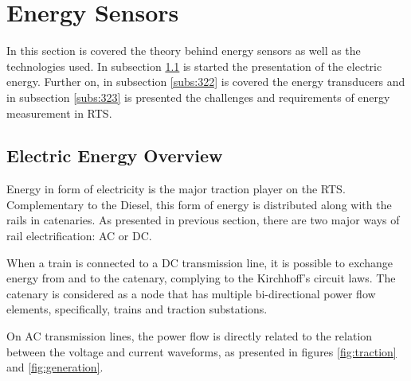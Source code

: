 


\section{Energy Sensors}


In this section is covered the theory behind energy sensors as well as the technologies used. In subsection \ref{subs:321} is started the presentation of the electric energy. Further on, in subsection \ref{subs:322} is covered the energy transducers and in subsection \ref{subs:323} is presented the challenges and requirements of energy measurement in \ac{RTS}. 

\subsection{Electric Energy Overview}
\label{subs:321}
Energy in form of electricity is the major traction player on the \ac{RTS}. 
Complementary to the Diesel, this form of energy is distributed along with the rails in catenaries.
As presented in previous section, there are two major ways of rail electrification: \ac{AC} or \ac{DC}.

When a train is connected to a DC transmission line, it is possible to exchange energy from and to the catenary, complying to the Kirchhoff's circuit laws. The catenary is considered as a node that has multiple bi-directional power flow elements, specifically, trains and traction substations.

On \ac{AC} transmission lines, the power flow is directly related to the relation between the voltage and current waveforms, as presented in figures \ref{fig:traction} and \ref{fig:generation}.

